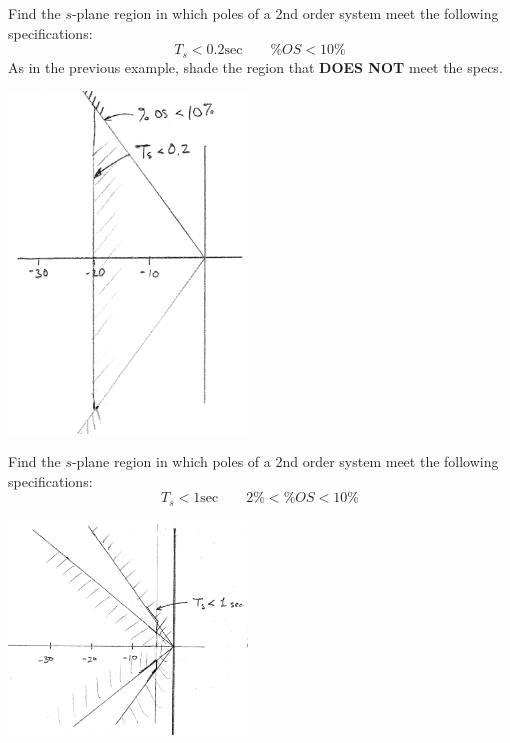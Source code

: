 \begin{ExampleSmall}
Find the $s$-plane region in which poles of a 2nd order system meet the following specifications:
\[
T_s < 0.2 \mathrm{sec} \qquad \%OS < 10\%
\]
As in the previous example, shade the region that {\bf DOES NOT} meet the specs.

\includegraphics[width=2.5in]{figs09/00789a.png}
\end{ExampleSmall}

\begin{ExampleSmall}
Find the $s$-plane region in which poles of a 2nd order system meet the following specifications:
\[
T_s < 1 \mathrm{sec} \qquad 2\% < \%OS < 10\%
\]

\includegraphics[width=2.5in]{figs09/00790a.png}
\end{ExampleSmall}

